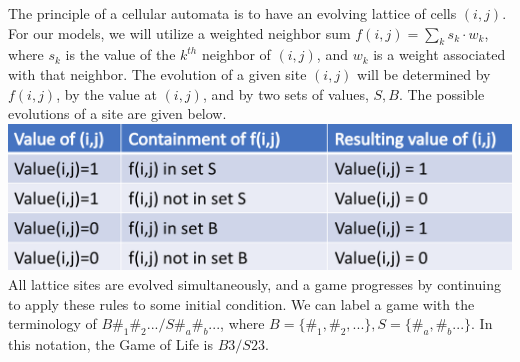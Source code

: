 \documentclass[a0paper,portrait]{baposter}
\begin{document}
\begin{poster}
{The principle of a cellular automata is to have an evolving lattice of cells $(i,j)$. For our models, we will utilize a weighted neighbor sum $f(i,j) = \sum_{k} s_k\cdot w_k$, where $s_k$ is the value of the $k^{th}$ neighbor of $(i,j)$, and $w_k$ is a weight associated with that neighbor. The evolution of a given site $(i,j)$ will be determined by $f(i,j)$, by the value at $(i,j)$, and by two sets of values, $S,B$. The possible evolutions of a site are given below.\\

\includegraphics[width=1\linewidth]{EvolutionTable.png}\\

All lattice sites are evolved simultaneously, and a game progresses by continuing to apply these rules to some initial condition.  We can label a game with the terminology of $B \#_1\#_2.../S\#_a\#_b...$, where $B = \{\#_1,\#_2,...\}, S = \{\#_a, \#_b...\}$. In this notation, the Game of Life is $B3/S23$. 

}



\end{poster}
\end{document}
